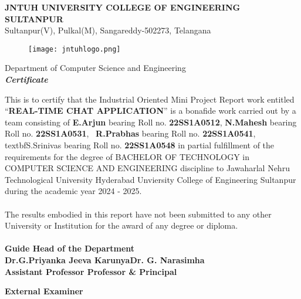 \documentclass[12pt,a4paper]{report}
\begin{document}

\begin{center}
 {\large\textbf{JNTUH UNIVERSITY COLLEGE OF ENGINEERING SULTANPUR}}\\
 \textup{\normalsize{Sultanpur(V), Pulkal(M), Sangareddy-502273, Telangana}}\\[1cm]
 
 \begin{figure}[h!]
  \centering
  \texttt{[image: jntuhlogo.png]}
 \end{figure}
 
 {\large\textup{Department of Computer Science and Engineering}}\\[1.0cm]
 {\Large \textbf{\textit{Certificate}}}\\
 \vspace{0.5cm}
\end{center}
This is to certify that the Industrial Oriented Mini Project Report work entitled “\textbf{REAL-TIME CHAT APPLICATION}”  is a bonafide work carried out by a team consisting of \textbf{E.Arjun} bearing Roll no. \textbf{22SS1A0512},  \textbf{N.Mahesh} bearing Roll no. \textbf{22SS1A0531}, \ \textbf{R.Prabhas} bearing Roll no. \textbf{22SS1A0541}, textbf{S.Srinivas} bearing Roll no. \textbf{22SS1A0548} in partial fulfillment of the requirements for the degree of BACHELOR OF TECHNOLOGY in COMPUTER SCIENCE AND ENGINEERING discipline to  Jawaharlal Nehru Technological University Hyderabad Unviersity College of Engineering Sultanpur during the academic year 2024 - 2025.\\ \\
The results embodied in this report have not been submitted to any other University or Institution for the award of any degree or diploma.\\
\vspace{1cm}\\
\textbf{Guide \hfill Head of the Department\\}
\textbf{Dr.G.Priyanka Jeeva Karunya\hfill Dr. G. Narasimha\\}
\textbf{Assistant Professor \hfill Professor \& Principal\\ }
\begin{center}
 \vspace{0.5 cm}
\end{center}

\begin{center}
\textbf{External Examiner}
\end{center}
\end{document}

